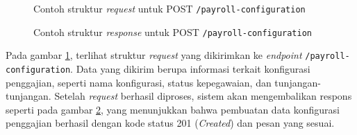\begin{figure}
    \centering
    \caption{Contoh struktur \textit{request} untuk POST \texttt{/payroll-configuration}}
    \label{fig:request_payroll_configuration_post}
\end{figure}
\begin{figure}
    \centering
    \caption{Contoh struktur \textit{response} untuk POST \texttt{/payroll-configuration}}
    \label{fig:response_payroll_configuration_post}
\end{figure}
Pada gambar \ref{fig:request_payroll_configuration_post}, terlihat struktur \textit{request} yang dikirimkan ke \textit{endpoint} \texttt{/payroll-configuration}. Data yang dikirim berupa informasi terkait konfigurasi penggajian, seperti nama konfigurasi, status kepegawaian, dan tunjangan-tunjangan. Setelah \textit{request} berhasil diproses, sistem akan mengembalikan respons seperti pada gambar \ref{fig:response_payroll_configuration_post}, yang menunjukkan bahwa pembuatan data konfigurasi penggajian berhasil dengan kode status 201 (\textit{Created}) dan pesan yang sesuai.

